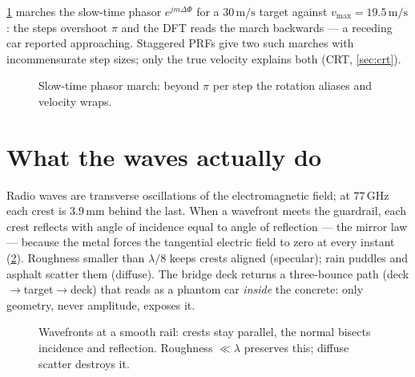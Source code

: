 \documentclass[11pt,oneside]{book}
\begin{document}
\cref{fig:phasor} marches the slow-time phasor $e^{jm\Delta\Phi}$ for a
$30\,\mathrm{m/s}$ target against $v_{\max}=19.5\,\mathrm{m/s}$: the steps
overshoot $\pi$ and the DFT reads the march backwards --- a receding car
reported approaching. Staggered PRFs give two such marches with incommensurate
step sizes; only the true velocity explains both (CRT, \cref{sec:crt}).

\begin{figure}[htbp]
\centering
{}
\caption{Slow-time phasor march: beyond $\pi$ per step the rotation aliases
and velocity wraps.}
\label{fig:phasor}
\end{figure}

\section{What the waves actually do}
\label{sec:waves}

Radio waves are transverse oscillations of the electromagnetic field; at
$77\,\mathrm{GHz}$ each crest is $3.9\,\mathrm{mm}$ behind the last. When a
wavefront meets the guardrail, each crest reflects with angle of incidence
equal to angle of reflection --- the mirror law --- because the metal
forces the tangential electric field to zero at every instant
(\cref{fig:wavefront}). Roughness smaller than $\lambda/8$ keeps crests
aligned (specular); rain puddles and asphalt scatter them (diffuse). The
bridge deck returns a three-bounce path (deck$\to$target$\to$deck) that
reads as a phantom car \emph{inside} the concrete: only geometry, never
amplitude, exposes it.

\begin{figure}[htbp]
\centering
{}
\caption{Wavefronts at a smooth rail: crests stay parallel, the normal
bisects incidence and reflection. Roughness $\ll\lambda$ preserves this;
diffuse scatter destroys it.}
\label{fig:wavefront}
\end{figure}
\end{document}

